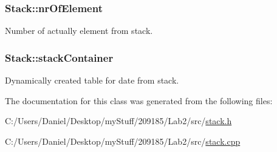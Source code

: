 \subsubsection[{nr\+Of\+Element}]{\setlength{\rightskip}{0pt plus 5cm}Stack\+::nr\+Of\+Element\hspace{0.3cm}{\ttfamily [private]}}\label{class_stack_a59b3d0f6dad7a0c6c131a87a765a9687}
Number of actually element from stack. \hypertarget{class_stack_aa14462f08b194e58a777a3390c0ebb31}{}
\subsubsection[{stack\+Container}]{\setlength{\rightskip}{0pt plus 5cm}Stack\+::stack\+Container\hspace{0.3cm}{\ttfamily [private]}}\label{class_stack_aa14462f08b194e58a777a3390c0ebb31}
Dynamically created table for date from stack. 

The documentation for this class was generated from the following files\+:\begin{DoxyCompactItemize}
\item 
C\+:/\+Users/\+Daniel/\+Desktop/my\+Stuff/209185/\+Lab2/src/\hyperlink{stack_8h}{stack.\+h}\item 
C\+:/\+Users/\+Daniel/\+Desktop/my\+Stuff/209185/\+Lab2/src/\hyperlink{stack_8cpp}{stack.\+cpp}\end{DoxyCompactItemize}
